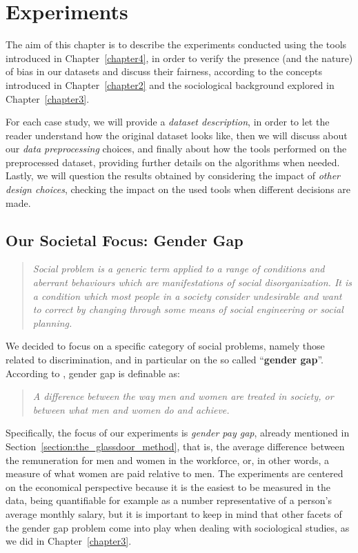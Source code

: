 \chapter{Experiments}
\label{chapter5}
\thispagestyle{empty}

The aim of this chapter is to describe the experiments conducted using the tools introduced in Chapter~\ref{chapter4}, in order to verify the presence (and the nature) of bias in our datasets and discuss their fairness, according to the concepts introduced in Chapter~\ref{chapter2} and the sociological background explored in Chapter~\ref{chapter3}.

For each case study, we will provide a \textit{dataset description}, in order to let the reader understand how the original dataset looks like, then we will discuss about our \textit{data preprocessing} choices, and finally about how the tools performed on the preprocessed dataset, providing further details on the algorithms when needed. Lastly, we will question the results obtained by considering the impact of \textit{other design choices}, checking the impact on the used tools when different decisions are made.


\section{Our Societal Focus: Gender Gap}
\begin{quote}\emph{Social problem is a generic term applied to a range of conditions and aberrant behaviours which are manifestations of social disorganization. It is a condition which most people in a society consider undesirable and want to correct by changing through some means of social engineering or social planning.} \cite{marschall1998oxford}\end{quote}
We decided to focus on a specific category of social problems, namely those related to discrimination, and in particular on the so called ``\textbf{gender gap}''. According to \cite{cambridge2013gender}, gender gap is definable as:
\begin{quote}\emph{A difference between the way men and women are treated in society, or between what men and women do and achieve.} \cite{cambridge2013gender}\end{quote}
Specifically, the focus of our experiments is \textit{gender pay gap}, already mentioned in Section~\ref{section:the_glassdoor_method}, that is, the average difference between the remuneration for men and women in the workforce, or, in other words, a measure of what women are paid relative to men. The experiments are centered on the economical perspective because it is the easiest to be measured in the data, being quantifiable for example as a number representative of a person's average monthly salary, but it is important to keep in mind that other facets of the gender gap problem come into play when dealing with sociological studies, as we did in Chapter~\ref{chapter3}.


